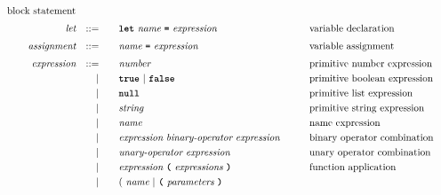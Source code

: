 \begin{alignat*}{9}
                                                           && \textrm{block statement}\\[1mm]         
&& \textit{let}          && ::= &\quad &&  \textbf{\texttt{let}}\  \textit{name} \ 
                                           \textbf{\texttt{=}}\  \textit{expression} 
                                                            && \textrm{variable declaration}   \\[1mm]
&& \textit{assignment}   && ::= &\quad &&  \textit{name} \ 
                                           \textbf{\texttt{=}}\  \textit{expression} 
                                                            && \textrm{variable assignment}   \\[1mm]
&& \textit{expression}   && ::= &\quad &&  \textit{number}   && \textrm{primitive number expression}\\
&&                       && |   &\quad && \textbf{\texttt{true}}\ |\ \textbf{\texttt{false}}
                                                           && \textrm{primitive boolean expression}\\
&&                       && |   &\quad && \textbf{\texttt{null}}
                                                           && \textrm{primitive list expression}\\
&&                       && |   &\quad &&  \textit{string}   && \textrm{primitive string expression}\\
&&                       && |   &\quad &&  \textit{name}   && \textrm{name expression}\\
&&                       && |   &\quad &&  \textit{expression} \  \textit{binary-operator} \ 
                                            \textit{expression} \qquad
                                                           && \textrm{binary operator combination}\\
&&                       && |   &\quad &&   \textit{unary-operator} \ 
                                            \textit{expression}
                                                           && \textrm{unary operator combination}\\
&&                       && |   &\quad &&   \textit{expression} \ 
                                            \textbf{\texttt{(}}\ \textit{expressions}\
                                            \textbf{\texttt{)}}
                                                           && \textrm{function application}\\
&&                       && |   &\quad &&   (\ \textit{name}\ | \
                                               \textbf{\texttt{(}}\ \textit{parameters}\ \textbf{\texttt{)}}\

\end{alignat*}
